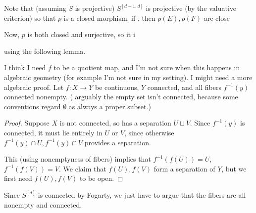 \documentclass[12pt]{article}
\begin{document}
Note that (assuming $S$ is projective) $S^{[d-1,d]}$ is projective (by the valuative criterion) so that $p$ is a closed morphism.  if , then $p(E),p(F)$ are close

Now, $p$ is both closed and surjective, so it i


using the following lemma.

\begin{lem}
    {\color{red} I think I need $f$ to be a quotient map, and I'm not sure when this happens in algebraic geometry (for example I'm not sure in my setting). I might need a more algebraic proof.} Let $f:X\to Y$ be continuous, $Y$ connected, and all fibers $f^{-1}(y)$ connected nonempty. ({\color{red} arguably the empty set isn't connected, because some conventions regard $\emptyset$ as always a proper subset.})
\end{lem}

\begin{proof}
    Suppose $X$ is not connected, so has a separation $U\sqcup V$. Since $f^{-1}(y)$ is connected, it must lie entirely in $U$ or $V$, since otherwise $f^{-1}(y)\cap U, f^{-1}(y)\cap V$ provides a separation.

    This (using nonemptyness of fibers) implies that $f^{-1}(f(U))=U$, $f^{-1}(f(V))=V$. We claim that $f(U),f(V)$ form a separation of $Y$, but we first need $f(U),f(V)$ to be open.
\end{proof}

Since $S^{[d]}$ is connected by Fogarty, we just have to argue that the fibers are all nonempty and connected.







\printbibliography
\end{document}
